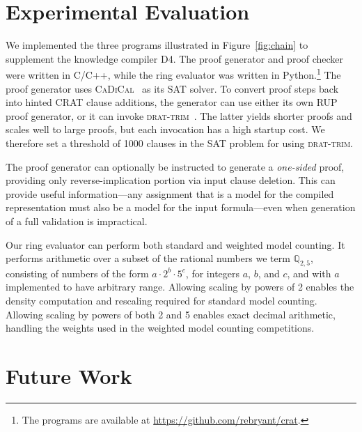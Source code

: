 \documentclass[letterpaper,USenglish,cleveref, autoref, thm-restate]{lipics-v2021}
\newcommand{\pand}{\mathbin{\land^{\sf p}}}
\newcommand{\dependencyset}{{\cal D}}
\newcommand{\drational}{\mathbb{Q}_{2,5}}
\newcommand{\modelset}{{\cal M}}
\newcommand{\makenode}[1]{\mathbf{#1}}
\newcommand{\nodeu}{\makenode{u}}
\newcommand{\progname}[1]{\textsc{#1}}
\newcommand{\dfour}{\progname{D4}}
\newcommand{\cadical}{\progname{CaDiCal}}
\newcommand{\dtrim}{\progname{drat-trim}}
\begin{document}



\section{Experimental Evaluation}
\label{sect:experimental}

We implemented the three programs illustrated in
Figure~\ref{fig:chain} to supplement the knowledge compiler \dfour{}.
The proof generator and proof checker were written in C/C++, while the
ring evaluator was written in Python.\footnote{The programs are
available at \url{https://github.com/rebryant/crat}.}  The proof
generator uses \cadical{}~\cite{biere-cadical-2019} as its SAT solver.  To convert proof steps
back into hinted CRAT clause additions, the generator can use either
its own RUP proof generator, or it can invoke \dtrim{}~\cite{RAT}.
The latter yields shorter proofs and scales well to large proofs, but
each invocation has a high startup cost.  We therefore set a threshold
of 1000 clauses in the SAT problem for using \dtrim{}.

The proof generator can optionally be instructed to generate a {\em
  one-sided} proof, providing only reverse-implication portion via
input clause deletion.  This can provide useful information---any
assignment that is a model for the compiled representation
must also be a model for the input formula---even when generation of a
full validation is impractical.

Our ring evaluator can perform both standard and weighted model
counting.  It performs arithmetic over a subset of the rational
numbers we term $\drational$, consisting of numbers of the form
$a \cdot 2^{b} \cdot 5^{c}$, for integers $a$, $b$, and $c$, and
with $a$ implemented to have arbitrary range.
Allowing scaling by powers of 2 enables the density computation
and rescaling required for standard model counting.  Allowing scaling
by powers of both 2 and 5 enables exact decimal arithmetic, handling
the weights used in the weighted model counting competitions.


\section{Future Work}
\label{sect:future}


\end{document}
